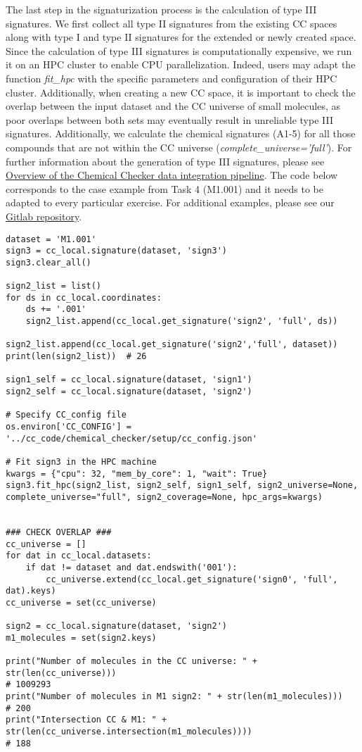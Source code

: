 The last step in the signaturization process is the calculation of type III signatures. We first collect all type II signatures from the existing CC spaces along with type I and type II signatures for the extended or newly created space. Since the calculation of type III signatures is computationally expensive, we run it on an HPC cluster to enable CPU parallelization. Indeed, users may adapt the function \textit{fit\_hpc} with the specific parameters and configuration of their HPC cluster. Additionally, when creating a new CC space, it is important to check the overlap between the input dataset and the CC universe of small molecules, as poor overlaps between both sets may eventually result in unreliable type III signatures. Additionally, we calculate the chemical signatures (A1-5) for all those compounds that are not within the CC universe (\textit{complete\_universe=’full’}). For further information about the generation of type III signatures, please see \hyperref[Overview of the Chemical Checker data integration pipeline]{Overview of the Chemical Checker data integration pipeline}. The code below corresponds to the case example from Task 4 (M1.001) and it needs to be adapted to every particular exercise. For additional examples, please see our \href{https://gitlabsbnb.irbbarcelona.org/packages/protocols}{Gitlab repository}. \\

\begin{lstlisting}
dataset = 'M1.001'
sign3 = cc_local.signature(dataset, 'sign3')
sign3.clear_all()

sign2_list = list()
for ds in cc_local.coordinates:
    ds += '.001'
    sign2_list.append(cc_local.get_signature('sign2', 'full', ds))

sign2_list.append(cc_local.get_signature('sign2','full', dataset))
print(len(sign2_list))  # 26

sign1_self = cc_local.signature(dataset, 'sign1')
sign2_self = cc_local.signature(dataset, 'sign2')

# Specify CC_config file
os.environ['CC_CONFIG'] = '../cc_code/chemical_checker/setup/cc_config.json'

# Fit sign3 in the HPC machine
kwargs = {"cpu": 32, "mem_by_core": 1, "wait": True}
sign3.fit_hpc(sign2_list, sign2_self, sign1_self, sign2_universe=None, complete_universe="full", sign2_coverage=None, hpc_args=kwargs)


### CHECK OVERLAP ###
cc_universe = []
for dat in cc_local.datasets:
    if dat != dataset and dat.endswith('001'):
        cc_universe.extend(cc_local.get_signature('sign0', 'full', dat).keys)
cc_universe = set(cc_universe)

sign2 = cc_local.signature(dataset, 'sign2')
m1_molecules = set(sign2.keys)

print("Number of molecules in the CC universe: " + str(len(cc_universe)))
# 1009293
print("Number of molecules in M1 sign2: " + str(len(m1_molecules)))
# 200
print("Intersection CC & M1: " + str(len(cc_universe.intersection(m1_molecules))))
# 188
\end{lstlisting}


